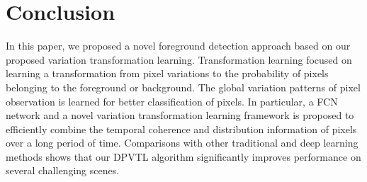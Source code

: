 \documentclass[journal]{IEEEtran}
\begin{document}




\section{Conclusion}
\label{sec6}
In this paper, we proposed a novel foreground detection approach based on our proposed variation transformation learning.
%
Transformation learning focused on learning a transformation from pixel variations to the probability of pixels belonging to the foreground or background.
%
The global variation patterns of pixel observation is learned for better classification of pixels.
%
In particular, a FCN network and a novel variation transformation learning framework is proposed to efficiently combine the temporal coherence and distribution information of pixels over a long period of time. 
%
Comparisons with other traditional and deep learning methods shows that our DPVTL algorithm significantly improves performance on several challenging scenes.

% 


\ifCLASSOPTIONcaptionsoff
  \newpage
\fi

  
  
\end{document}
